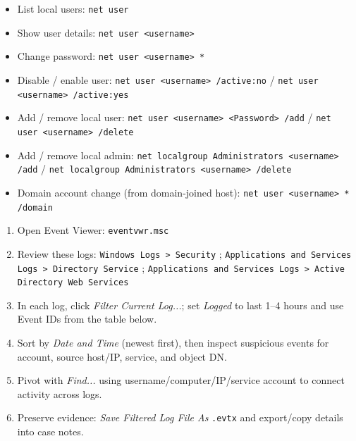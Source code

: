 \documentclass[10pt]{article}
\begin{document}
\begin{tcolorbox}[title=User Changes (net user / net localgroup)]
\begin{itemize}[leftmargin=1.1em, itemsep=1pt, topsep=2pt]
  \item List local users: \verb!net user!
  \item Show user details: \verb!net user <username>!
  \item Change password: \verb!net user <username> *!
  \item Disable / enable user: \verb!net user <username> /active:no! / \verb!net user <username> /active:yes!
  \item Add / remove local user: \verb!net user <username> <Password> /add! / \verb!net user <username> /delete!
  \item Add / remove local admin: \verb!net localgroup Administrators <username> /add! / \verb!net localgroup Administrators <username> /delete!
  \item Domain account change (from domain-joined host): \verb!net user <username> * /domain!
\end{itemize}
\end{tcolorbox}

\begin{tcolorbox}[title=Event Viewer Flow (LDAP / AD Services)]
\begin{enumerate}[leftmargin=1.2em, itemsep=1pt, topsep=2pt]
  \item Open Event Viewer: \verb!eventvwr.msc!
  \item Review these logs:
    \verb!Windows Logs > Security! ;
    \verb!Applications and Services Logs > Directory Service! ;
    \verb!Applications and Services Logs > Active Directory Web Services!
  \item In each log, click \textit{Filter Current Log...}; set \textit{Logged} to last 1--4 hours and use Event IDs from the table below.
  \item Sort by \textit{Date and Time} (newest first), then inspect suspicious events for account, source host/IP, service, and object DN.
  \item Pivot with \textit{Find...} using username/computer/IP/service account to connect activity across logs.
  \item Preserve evidence: \textit{Save Filtered Log File As} \verb!.evtx! and export/copy details into case notes.
\end{enumerate}
\end{tcolorbox}
\end{document}
